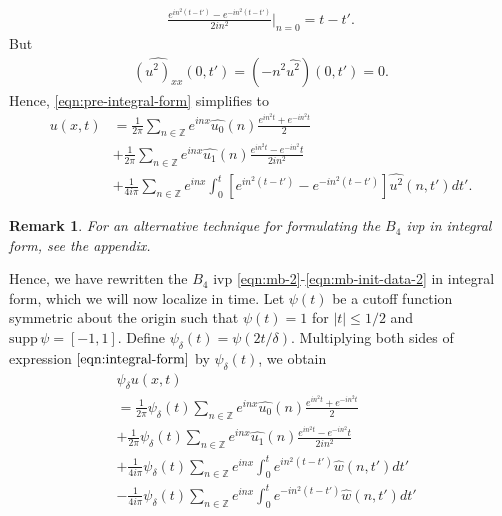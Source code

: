 \documentclass[12pt,reqno]{amsart}
\numberwithin{equation}{section}  %
\newcommand{\zz}{\mathbb{Z}}
\newcommand{\wh}{\widehat}
\newtheorem{remark}[theorem]{Remark}
\begin{document}
%
%
\begin{equation*}
\begin{split}
  \frac{e^{in^{2}(t - t')} - e^{-in^{2}(t-t')}}{2 i n^{2}} \Big |_{n=0} = t-t'.
\end{split}
\end{equation*}
%
%
But 
%
%
\begin{equation*}
\begin{split}
  \wh{(u^{2})_{xx}}(0, t') = (-n^{2} \wh{u^{2}})(0, t') = 0.
\end{split}
\end{equation*}
%
%
Hence, \eqref{eqn:pre-integral-form} simplifies to
%
\begin{equation}
  \begin{split}
    u(x,t)
    & = \frac{1}{2\pi}\sum_{n \in \zz} e^{inx} \wh{u_{0}}(n) \frac{e^{in^{2}t} + e^{-in^{2}t}}{2} 
    \\
    & + \frac{1}{2 \pi}\sum_{n \in \zz} e^{inx}
    \wh{u_{1}}(n)\frac{e^{in^{2}t} - e^{-in^{2}}t}{2 i n^{2}} 
    \\
    & + \frac{1}{4 i \pi}\sum_{n \in \zz} e^{inx}
    \int_{0}^{t}[e^{in^{2}(t-t')}-e^{-in^{2}(t-t')}]
    \wh{u^{2}}(n, t') dt'.
  \end{split}
  \label{eqn:integral-form}
\end{equation}
%
\begin{framed}
  \begin{remark}
For an alternative technique for formulating the $B_{4}$ ivp in integral form,
see the appendix.
\end{remark}
\end{framed}
Hence, we have rewritten the $B_{4}$ ivp
\eqref{eqn:mb-2}-\eqref{eqn:mb-init-data-2} in integral form, which we will now
localize in time. 
Let $\psi(t)$ be a cutoff function symmetric about the 
origin such that $\psi(t) = 1$ for $|t| \le 1/2$ and $\text{supp} \, \psi 
= [-1, 1 ]$.
Define $\psi_{\delta}(t) = \psi(2t/\delta)$.  Multiplying both sides of expression
$\eqref{eqn:integral-form}$ by $\psi_{\delta}(t)$, we obtain
%
%
\begin{align}
  & \psi_{\delta}u(x,t) 
    \\
    & = \frac{1}{2 \pi}\psi_{\delta}(t)
    \sum_{n \in \zz} e^{inx} \wh{u_{0}}(n) \frac{e^{in^{2}t} + e^{-in^{2}t}}{2} 
    \\
    & + \frac{1}{2 \pi}\psi_{\delta}(t) \sum_{n \in \zz} e^{inx}
    \wh{u_{1}}(n)\frac{e^{in^{2}t} - e^{-in^{2}}t}{2 i n^{2}} 
    \\
    \label{term-3}
    & + \frac{1}{4 i \pi}\psi_{\delta}(t) \sum_{n \in \zz} e^{inx}
    \int_{0}^{t}e^{in^{2}(t-t')}
    \wh{w}(n, t') dt'
    \\
    \label{term-4}
    & - \frac{1}{4 i \pi}\psi_{\delta}(t) \sum_{n \in \zz} e^{inx}
    \int_{0}^{t}e^{-in^{2}(t-t')}
    \wh{w}(n, t') dt'
  \end{align}
\end{document}
